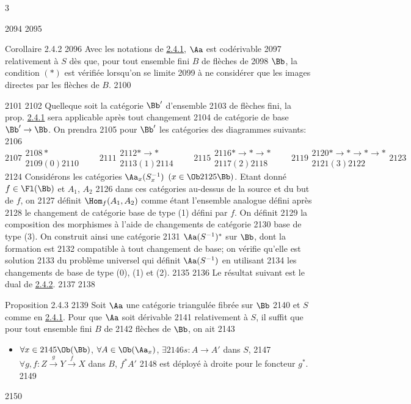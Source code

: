 3	\documentclass[10pt]{../fichiers-configuration-latex/smfart}
\begin{document}
  2094	
  2095	\begin{enonce*}{Corollaire 2.4.2}
  2096	Avec les notations de \hyperref[XVII.prop2.4.1]{2.4.1}, $\Aa$ est codérivable
  2097	relativement à $S$ dès que, pour tout ensemble fini $B$ de flèches de
  2098	$\Bb$, la condition $(\ast)$ est vérifiée lorsqu'on se limite
  2099	à ne considérer que les images directes par les flèches de $B$.
  2100	\end{enonce*}
  2101	
  2102	Quelle\pageoriginale que soit la catégorie $\Bb'$ d'ensemble
  2103	de flèches fini, la prop. \hyperref[XVII.prop2.4.1]{2.4.1} sera applicable après tout changement
  2104	de catégorie de base $\Bb'\rightarrow \Bb$. On prendra
  2105	pour $\Bb'$ les catégories des diagrammes suivants:
  2106	\[
  2107	  \begin{gathered}
  2108	    *\\
  2109	    (0)
  2110	  \end{gathered}\qquad
  2111	  \begin{gathered}
  2112	    *\to*\\
  2113	    (1)
  2114	  \end{gathered}\qquad
  2115	  \begin{gathered}
  2116	    *\to*\to*\\
  2117	    (2)
  2118	  \end{gathered}\qquad
  2119	  \begin{gathered}
  2120	    *\to*\to*\to*\\
  2121	    (3)
  2122	  \end{gathered}
  2123	\]
  2124	Considérons les catégories $\Aa_x(S^{-1}_x)$ $(x\in \Ob
  2125	\Bb)$. Etant donné $f\in \Fl(\Bb)$ et $A_1$, $A_2$
  2126	dans ces catégories au-dessus de la source et du but de $f$, on
  2127	définit $\Hom_f(A_1,A_2)$ comme étant l'ensemble analogue défini après
  2128	le changement de catégorie base de type (1) défini par $f$. On définit
  2129	la composition des morphismes à l'aide de changements de catégorie
  2130	base de type (3). On construit ainsi une catégorie
  2131	$\Aa(S^{-1})^{\ast}$ sur $\Bb$, dont la formation est
  2132	compatible à tout changement de base; on vérifie qu'elle est solution
  2133	du problème universel qui définit $\Aa(S^{-1})$ en utilisant
  2134	les changements de base de type (0), (1) et (2).
  2135	
  2136	Le résultat suivant est le dual de \hyperref[XVII.cor2.4.2]{2.4.2}.
  2137	
  2138	\begin{enonce*}{Proposition 2.4.3}
  2139	Soit $\Aa$ une catégorie triangulée fibrée sur $\Bb$
  2140	et $S$ comme en \hyperref[XVII.prop2.4.1]{2.4.1}. Pour que $\Aa$ soit dérivable
  2141	relativement à $S$, il suffit que pour tout ensemble fini $B$ de
  2142	flèches de $\Bb$, on ait
  2143	\begin{itemize}
  2144	\item[$(\ast')$] $\forall x \in
  2145	\Ob(\Bb)$, $\forall A\in\Ob (\Aa_x)$, $\exists
  2146	s:A\rightarrow A'$ dans $S$,
  2147	$\forall g,f:Z\xrightarrow{g}Y\xrightarrow{f}X$ dans $B$, $f^{\ast}A'$
  2148	est déployé à droite pour le foncteur $g^{\ast}$.
  2149	\end{itemize}
  2150	\end{enonce*}
\end{document}
